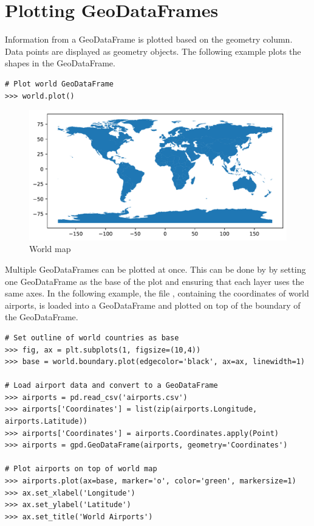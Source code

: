 \section*{Plotting GeoDataFrames} %

Information from a GeoDataFrame is plotted based on the geometry column.
Data points are displayed as geometry objects.
The following example plots the shapes in the  GeoDataFrame.

\begin{lstlisting}
# Plot world GeoDataFrame
>>> world.plot()
\end{lstlisting}

\begin{figure}[H]
\begin{center}
\includegraphics[scale=.7]{figures/worldmap.pdf}
\end{center}
\label{world-map}
\caption{World map}
\end{figure}

Multiple GeoDataFrames can be plotted at once.
This can be done by by setting one GeoDataFrame as the base of the plot and ensuring that each layer uses the same axes.
In the following example, the file , containing the coordinates of world airports, is loaded into a GeoDataFrame and plotted on top of the boundary of the  GeoDataFrame.

\begin{lstlisting}
# Set outline of world countries as base
>>> fig, ax = plt.subplots(1, figsize=(10,4))
>>> base = world.boundary.plot(edgecolor='black', ax=ax, linewidth=1)

# Load airport data and convert to a GeoDataFrame
>>> airports = pd.read_csv('airports.csv')
>>> airports['Coordinates'] = list(zip(airports.Longitude, airports.Latitude))
>>> airports['Coordinates'] = airports.Coordinates.apply(Point)
>>> airports = gpd.GeoDataFrame(airports, geometry='Coordinates')

# Plot airports on top of world map
>>> airports.plot(ax=base, marker='o', color='green', markersize=1)
>>> ax.set_xlabel('Longitude')
>>> ax.set_ylabel('Latitude')
>>> ax.set_title('World Airports')
\end{lstlisting}

